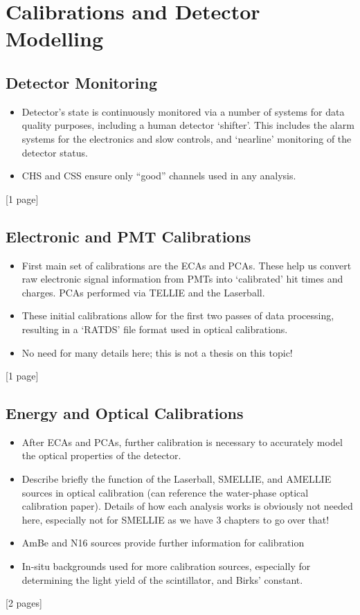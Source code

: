 {    \section{Calibrations and Detector Modelling}
    \subsection{Detector Monitoring}
    \begin{itemize}
        \item Detector's state is continuously monitored via a number of systems for data quality purposes, including a human detector `shifter'. This includes the alarm systems for the electronics and slow controls, and `nearline' monitoring of the detector status.
        \item CHS and CSS ensure only ``good'' channels used in any analysis.
    \end{itemize}
    [1 page]
    \subsection{Electronic and PMT Calibrations}
    \begin{itemize}
        \item First main set of calibrations are the ECAs and PCAs. These help us convert raw electronic signal information from PMTs into `calibrated' hit times and charges. PCAs performed via TELLIE and the Laserball.
        \item These initial calibrations allow for the first two passes of data processing, resulting in a `RATDS' file format used in optical calibrations.
        \item No need for many details here; this is not a thesis on this topic!
    \end{itemize}
    [1 page]
    \subsection{Energy and Optical Calibrations}
    \begin{itemize}
        \item After ECAs and PCAs, further calibration is necessary to accurately model the optical properties of the detector.
        \item Describe briefly the function of the Laserball, SMELLIE, and AMELLIE sources in optical calibration (can reference the water-phase optical calibration paper). Details of how each analysis works is obviously not needed here, especially not for SMELLIE as we have 3 chapters to go over that!
        \item AmBe and N16 sources provide further information for calibration
        \item In-situ backgrounds used for more calibration sources, especially for determining the light yield of the scintillator, and Birks' constant.
    \end{itemize}
    [2 pages]
}
